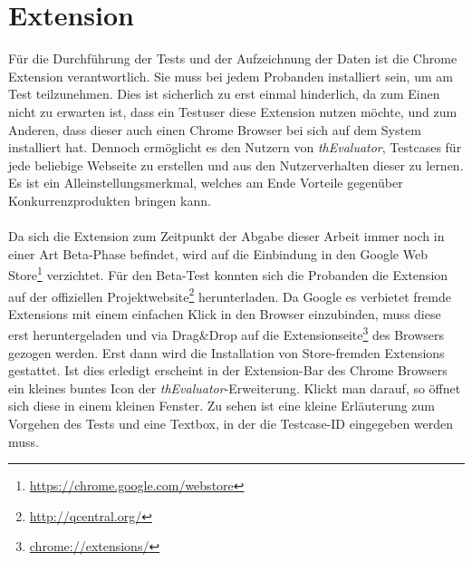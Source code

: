 %
%
%
%


\section{Extension}

Für die Durchführung der Tests und der Aufzeichnung der Daten ist die Chrome Extension verantwortlich. Sie muss bei jedem Probanden installiert sein, um am Test teilzunehmen. Dies ist sicherlich zu erst einmal hinderlich, da zum Einen nicht zu erwarten ist, dass ein Testuser diese Extension nutzen möchte, und zum Anderen, dass dieser auch einen Chrome Browser bei sich auf dem System installiert hat. Dennoch ermöglicht es den Nutzern von \textit{thEvaluator}, Testcases für jede beliebige Webseite zu erstellen und aus den Nutzerverhalten dieser zu lernen. Es ist ein Alleinstellungsmerkmal, welches am Ende Vorteile gegenüber Konkurrenzprodukten bringen kann.\\
\\
Da sich die Extension zum Zeitpunkt der Abgabe dieser Arbeit immer noch in einer Art Beta-Phase befindet, wird auf die Einbindung in den Google Web Store\footnote{\url{https://chrome.google.com/webstore}} verzichtet. Für den Beta-Test konnten sich die Probanden die Extension auf der offiziellen Projektwebsite\footnote{\url{http://qcentral.org/}} herunterladen. Da Google es verbietet fremde Extensions mit einem einfachen Klick in den Browser einzubinden, muss diese erst heruntergeladen und via Drag\&Drop auf die Extensionseite\footnote{\url{chrome://extensions/}} des Browsers gezogen werden. Erst dann wird die Installation von Store-fremden Extensions gestattet. Ist dies erledigt erscheint in der Extension-Bar des Chrome Browsers ein kleines buntes Icon der \textit{thEvaluator}-Erweiterung. Klickt man darauf, so öffnet sich diese in einem kleinen Fenster. Zu sehen ist eine kleine Erläuterung zum Vorgehen des Tests und eine Textbox, in der die Testcase-ID eingegeben werden muss.

